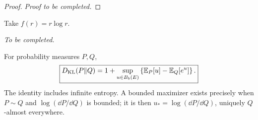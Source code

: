 \documentclass[12pt,a4paper,oneside]{book}
\begin{document}
\begin{proof}
\noindent\textit{Proof to be completed.}
\end{proof}



\begin{example}[KL as an $f$-divergence]
\leavevmode\par\nobreak
\begin{Question}
    Take $f(r)=r\log r$.
\end{Question}

\noindent\textit{To be completed.}

\end{example}

\begin{theorem}
\label{thm:kl-exponential-duality}
\label{src:p11q10}
For probability measures $P,Q$,
\begin{equation}
 \boxed{D_{\mathrm{KL}}(P\Vert Q)
 =1+\sup_{u\in B_b(E)}
       \left\{\mathbb E_P[u]-\mathbb E_Q[e^u]\right\}.}
\label{eq:kl-exp-dual}
\end{equation}
The identity includes infinite entropy. A bounded maximizer exists
precisely when $P\sim Q$ and $\log(\dd P/\dd Q)$ is bounded; it is then
$u_*=\log(\dd P/\dd Q)$, uniquely $Q$-almost everywhere.
\end{theorem}
\end{document}
